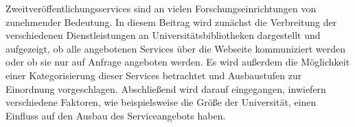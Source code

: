 Zweitveröffentlichungsservices sind an vielen Forschungseinrichtungen
von zunehmender Bedeutung. In diesem Beitrag wird zunächst die
Verbreitung der verschiedenen Dienstleistungen an
Universitätsbibliotheken dargestellt und aufgezeigt, ob alle angebotenen
Services über die Webseite kommuniziert werden oder ob sie nur auf
Anfrage angeboten werden. Es wird außerdem die Möglichkeit einer
Kategorisierung dieser Services betrachtet und Ausbaustufen zur
Einordnung vorgeschlagen. Abschließend wird darauf eingegangen,
inwiefern verschiedene Faktoren, wie beispielsweise die Größe der
Universität, einen Einfluss auf den Ausbau des Serviceangebots haben.
